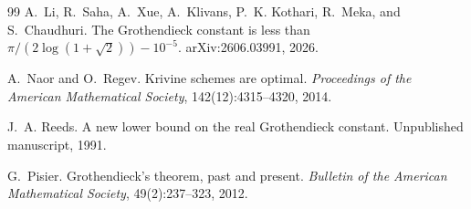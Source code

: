 \documentclass[11pt]{article}
\newcommand{\1}{\mathbf 1}
\theoremstyle{plain}
\theoremstyle{definition}
\theoremstyle{remark}
\begin{document}
\begin{thebibliography}{99}
A.~Li, R.~Saha, A.~Xue, A.~Klivans, P.~K. Kothari, R.~Meka, and S.~Chaudhuri.
The Grothendieck constant is less than \(\pi/(2\log(1+\sqrt2))-10^{-5}\).
arXiv:2606.03991, 2026.

A.~Naor and O.~Regev.
Krivine schemes are optimal.
\emph{Proceedings of the American Mathematical Society}, 142(12):4315--4320, 2014.


J.~A. Reeds.
A new lower bound on the real Grothendieck constant.
Unpublished manuscript, 1991.

G.~Pisier.
Grothendieck's theorem, past and present.
\emph{Bulletin of the American Mathematical Society}, 49(2):237--323, 2012.

\end{thebibliography}
\end{document}
